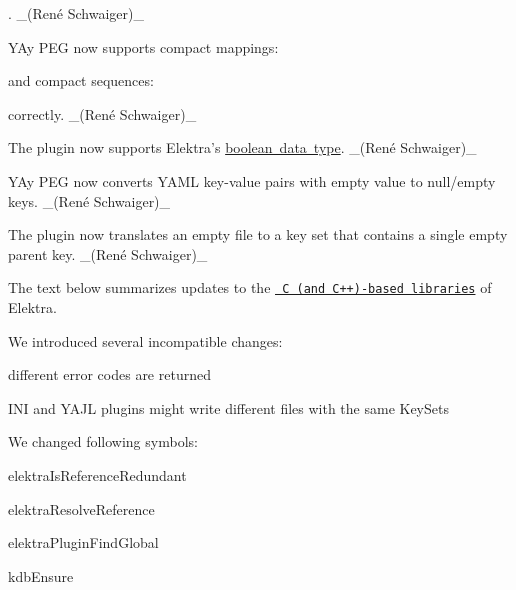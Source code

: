 . \+\_\+(René Schwaiger)\+\_\+


\begin{DoxyItemize}
\item Y\+Ay P\+EG now supports compact mappings\+:
\end{DoxyItemize}


\begin{DoxyCode}{0}
\end{DoxyCode}


and compact sequences\+:


\begin{DoxyCode}{0}
\end{DoxyCode}


correctly. \+\_\+(René Schwaiger)\+\_\+


\begin{DoxyItemize}
\item The plugin now supports Elektra’s \mbox{\hyperlink{doc_decisions_boolean_md}{boolean data type}}. \+\_\+(René Schwaiger)\+\_\+
\item Y\+Ay P\+EG now converts Y\+A\+ML key-\/value pairs with empty value to null/empty keys. \+\_\+(René Schwaiger)\+\_\+
\item The plugin now translates an empty file to a key set that contains a single empty parent key. \+\_\+(René Schwaiger)\+\_\+
\end{DoxyItemize}

The text below summarizes updates to the \href{https://www.libelektra.org/libraries/readme}{\texttt{ C (and C++)-\/based libraries}} of Elektra.

We introduced several incompatible changes\+:


\begin{DoxyItemize}
\item different error codes are returned
\item I\+NI and Y\+A\+JL plugins might write different files with the same Key\+Sets
\end{DoxyItemize}

We changed following symbols\+:


\begin{DoxyItemize}
\item elektra\+Is\+Reference\+Redundant
\item elektra\+Resolve\+Reference
\item elektra\+Plugin\+Find\+Global
\item kdb\+Ensure
\end{DoxyItemize}


